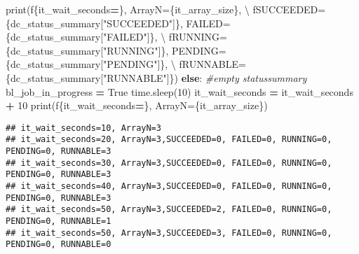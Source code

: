\documentclass[
]{book}
\newenvironment{Shaded}{\begin{snugshade}}{\end{snugshade}}
\newcommand{\BuiltInTok}[1]{#1}
\newcommand{\CommentTok}[1]{\textcolor[rgb]{0.56,0.35,0.01}{\textit{#1}}}
\newcommand{\ControlFlowTok}[1]{\textcolor[rgb]{0.13,0.29,0.53}{\textbf{#1}}}
\newcommand{\DecValTok}[1]{\textcolor[rgb]{0.00,0.00,0.81}{#1}}
\newcommand{\NormalTok}[1]{#1}
\newcommand{\OperatorTok}[1]{\textcolor[rgb]{0.81,0.36,0.00}{\textbf{#1}}}
\newcommand{\SpecialCharTok}[1]{\textcolor[rgb]{0.00,0.00,0.00}{#1}}
\newcommand{\SpecialStringTok}[1]{\textcolor[rgb]{0.31,0.60,0.02}{#1}}
\newcommand{\StringTok}[1]{\textcolor[rgb]{0.31,0.60,0.02}{#1}}
\newcommand{\VariableTok}[1]{\textcolor[rgb]{0.00,0.00,0.00}{#1}}
\begin{document}
\begin{Shaded}
\begin{Highlighting}[]
        \BuiltInTok{print}\NormalTok{(}\SpecialStringTok{f\textquotesingle{}}\SpecialCharTok{\{}\NormalTok{it\_wait\_seconds}\OperatorTok{=}\SpecialCharTok{\}}\SpecialStringTok{, ArrayN=}\SpecialCharTok{\{}\NormalTok{it\_array\_size}\SpecialCharTok{\}}\SpecialStringTok{,\textquotesingle{}}\NormalTok{ \textbackslash{}}
              \SpecialStringTok{f\textquotesingle{}SUCCEEDED=}\SpecialCharTok{\{}\NormalTok{dc\_status\_summary[}\StringTok{"SUCCEEDED"}\NormalTok{]}\SpecialCharTok{\}}\SpecialStringTok{, FAILED=}\SpecialCharTok{\{}\NormalTok{dc\_status\_summary[}\StringTok{"FAILED"}\NormalTok{]}\SpecialCharTok{\}}\SpecialStringTok{, \textquotesingle{}}\NormalTok{ \textbackslash{}}
              \SpecialStringTok{f\textquotesingle{}RUNNING=}\SpecialCharTok{\{}\NormalTok{dc\_status\_summary[}\StringTok{"RUNNING"}\NormalTok{]}\SpecialCharTok{\}}\SpecialStringTok{, PENDING=}\SpecialCharTok{\{}\NormalTok{dc\_status\_summary[}\StringTok{"PENDING"}\NormalTok{]}\SpecialCharTok{\}}\SpecialStringTok{, \textquotesingle{}}\NormalTok{ \textbackslash{}}
              \SpecialStringTok{f\textquotesingle{}RUNNABLE=}\SpecialCharTok{\{}\NormalTok{dc\_status\_summary[}\StringTok{"RUNNABLE"}\NormalTok{]}\SpecialCharTok{\}}\SpecialStringTok{\textquotesingle{}}\NormalTok{)}
    \ControlFlowTok{else}\NormalTok{:}
        \CommentTok{\#empty statussummary}
\NormalTok{        bl\_job\_in\_progress }\OperatorTok{=} \VariableTok{True}
\NormalTok{        time.sleep(}\DecValTok{10}\NormalTok{)}
\NormalTok{        it\_wait\_seconds }\OperatorTok{=}\NormalTok{ it\_wait\_seconds }\OperatorTok{+} \DecValTok{10}
        \BuiltInTok{print}\NormalTok{(}\SpecialStringTok{f\textquotesingle{}}\SpecialCharTok{\{}\NormalTok{it\_wait\_seconds}\OperatorTok{=}\SpecialCharTok{\}}\SpecialStringTok{, ArrayN=}\SpecialCharTok{\{}\NormalTok{it\_array\_size}\SpecialCharTok{\}}\SpecialStringTok{\textquotesingle{}}\NormalTok{)}
\end{Highlighting}
\end{Shaded}

\begin{verbatim}
## it_wait_seconds=10, ArrayN=3
## it_wait_seconds=20, ArrayN=3,SUCCEEDED=0, FAILED=0, RUNNING=0, PENDING=0, RUNNABLE=3
## it_wait_seconds=30, ArrayN=3,SUCCEEDED=0, FAILED=0, RUNNING=0, PENDING=0, RUNNABLE=3
## it_wait_seconds=40, ArrayN=3,SUCCEEDED=0, FAILED=0, RUNNING=0, PENDING=0, RUNNABLE=3
## it_wait_seconds=50, ArrayN=3,SUCCEEDED=2, FAILED=0, RUNNING=0, PENDING=0, RUNNABLE=1
## it_wait_seconds=50, ArrayN=3,SUCCEEDED=3, FAILED=0, RUNNING=0, PENDING=0, RUNNABLE=0
\end{verbatim}
\end{document}

